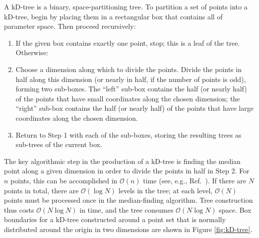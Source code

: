\documentclass[prd,preprint]{revtex4}
\newcommand{\order}[1]{\mathcal{O}\left( #1 \right)}
\begin{document}
A kD-tree is a binary, space-partitioning tree.  To partition a set of
points into a kD-tree, begin by placing them in a rectangular box that
contains all of parameter space.  Then proceed recursively:
\begin{enumerate}
\item If the given box contains exactly one point, stop; this is a
  leaf of the tree.  Otherwise:
\item Choose a dimension along which to divide the points.  Divide the
  points in half along this dimension (or nearly in half, if the
  number of points is odd), forming two sub-boxes.  The ``left''
  sub-box contains the half (or nearly half) of the points that have
  small coordinates along the chosen dimension; the ``right'' sub-box
  contains the half (or nearly half) of the points that have large
  coordinates along the chosen dimension.
\item Return to Step 1 with each of the sub-boxes, storing the
  resulting trees as sub-trees of the current box.
\end{enumerate}
The key algorithmic step in the production of a kD-tree is finding the
median point along a given dimension in order to divide the points in
half in Step 2.  For $n$ points, this can be accomplished in
$\order{n}$ time (see, e.g., Ref.~\cite{Press2007}).  If there are $N$
points in total, there are $\order{\log N}$ levels in the tree; at
each level, $\order{N}$ points must be processed once in the
median-finding algorithm.  Tree construction thus costs $\order{N \log
  N}$ in time, and the tree consumes $\order{N \log N}$ space.  Box
boundaries for a kD-tree constructed around a point set that is
normally distributed around the origin in two dimensions are shown in
Figure \ref{fig:kD-tree}.
\end{document}

